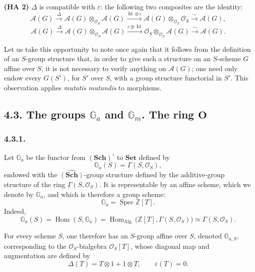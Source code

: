 \noindent\textbf{(HA 2)}
\(\Delta\) is compatible with \(\varepsilon\): the following two composites
are the identity:
\[
  \mathscr A(G)
    \xrightarrow{\Delta}
  \mathscr A(G)\otimes_{\mathcal O_S}\mathscr A(G)
    \xrightarrow{\operatorname{Id}\otimes\varepsilon}
  \mathscr A(G)\otimes_{\mathcal O_S}\mathcal O_S
    \xrightarrow{\ \sim\ }
  \mathscr A(G),
\]
\[
  \mathscr A(G)
    \xrightarrow{\Delta}
  \mathscr A(G)\otimes_{\mathcal O_S}\mathscr A(G)
    \xrightarrow{\varepsilon\otimes\operatorname{Id}}
  \mathcal O_S\otimes_{\mathcal O_S}\mathscr A(G)
    \xrightarrow{\ \sim\ }
  \mathscr A(G).
\]

Let us take this opportunity to note once again that it follows from the
definition of an \(S\)-group structure that, in order to give such a
structure on an \(S\)-scheme \(G\) affine over \(S\), it is not necessary
to verify anything on \(\mathscr A(G)\); one need only endow every
\(G(S')\), for \(S'\) over \(S\), with a group structure functorial in
\(S'\). This observation applies \emph{mutatis mutandis} to morphisms.

\subsection*{4.3. The groups \(\mathbb G_a\) and \(\mathbb G_m\). The ring
\(\mathbf O\)}

\subsubsection*{4.3.1.}

Let \(\mathbb G_a\) be the functor from \((\mathbf{Sch})^{\circ}\) to
\(\mathbf{Set}\) defined by
\[
  \mathbb G_a(S)=\Gamma(S,\mathcal O_S),
\]
endowed with the \(\widehat{(\mathbf{Sch})}\)-group structure defined by
the additive-group structure of the ring \(\Gamma(S,\mathcal O_S)\). It
is representable by an affine scheme, which we denote by \(\mathbb G_a\),
and which is therefore a group scheme:
\[
  \mathbb G_a=\operatorname{Spec}\mathbb Z[T].
\]
Indeed,
\[
  \mathbb G_a(S)
    =\operatorname{Hom}(S,\mathbb G_a)
    =\operatorname{Hom}_{\mathrm{Alg.}}
       \bigl(\mathbb Z[T],\Gamma(S,\mathcal O_S)\bigr)
    \simeq\Gamma(S,\mathcal O_S).
\]

For every scheme \(S\), one therefore has an \(S\)-group affine over
\(S\), denoted \(\mathbb G_{a,S}\), corresponding to the
\(\mathcal O_S\)-bialgebra \(\mathcal O_S[T]\), whose diagonal map and
augmentation are defined by
\[
  \Delta(T)=T\otimes1+1\otimes T,
  \qquad
  \varepsilon(T)=0.
\]

